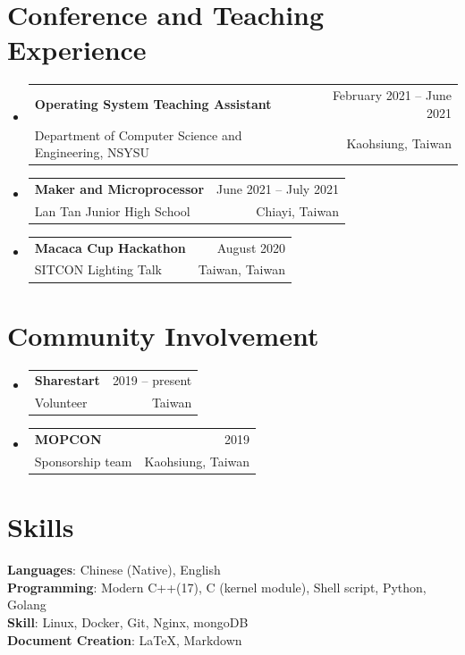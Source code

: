 \documentclass[A4,11pt]{article}
\makeatletter
\newcommand{\CVSubheading}[4]{
  \vspace{-2pt}\item
    \begin{tabular*}{0.97\textwidth}[t]{l@{\extracolsep{\fill}}r}
      \textbf{#1} & #2 \\
      \small#3 & \small #4 \\
    \end{tabular*}\vspace{-7pt}
}
\newcommand{\CVSubHeadingListStart}{\begin{itemize}[leftmargin=0.5cm, label={}]}
\newcommand{\CVSubHeadingListEnd}{\end{itemize}}
\makeatother
\begin{document}
\section{Conference and Teaching Experience}
\CVSubHeadingListStart
\CVSubheading
{Operating System Teaching Assistant}{February 2021 -- June 2021}
{Department of Computer Science and Engineering, NSYSU}{Kaohsiung, Taiwan}

\CVSubheading
{Maker and Microprocessor}{June 2021 -- July 2021}
{Lan Tan Junior High School}{Chiayi, Taiwan}

\CVSubheading
{Macaca Cup Hackathon}{August 2020}
{SITCON Lighting Talk}{Taiwan, Taiwan}

\CVSubHeadingListEnd

\section{Community Involvement}
\CVSubHeadingListStart
\CVSubheading
{Sharestart}{2019 -- present}{Volunteer}{Taiwan}
\CVSubheading
{MOPCON}{2019}{Sponsorship team}{Kaohsiung, Taiwan}
\CVSubHeadingListEnd

\section{Skills}
\begin{itemize}[leftmargin=0.5cm, label={}]
  \small{\item{
        \textbf{Languages}{: Chinese (Native), English} \\
        \textbf{Programming}{: Modern C++(17), C (kernel module), Shell script, Python, Golang } \\
        \textbf{Skill}{: Linux, Docker, Git, Nginx, mongoDB } \\
        \textbf{Document Creation}{: \LaTeX, Markdown} \\
        }}
\end{itemize}

\end{document}

